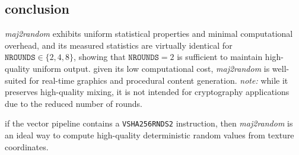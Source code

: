\documentclass{scrartcl}
\begin{document}
\subsection*{conclusion}

\noindent
\emph{maj2random} exhibits uniform statistical properties and minimal
computational overhead, and its measured statistics are virtually
identical for $\mathtt{NROUNDS} \in \{2, 4, 8\}$, showing that
$\mathtt{NROUNDS}=2$ is sufficient to maintain high-quality uniform output.
given its low computational cost,  \emph{maj2random} is well-suited for
real-time graphics and procedural content generation.  \emph{note:} while
it preserves high-quality mixing, it is not intended for cryptography
applications due to the reduced number of rounds.
\\
\par\noindent
if the vector pipeline contains a \texttt{VSHA256RNDS2} instruction, then
\emph{maj2random} is an ideal way to compute high-quality deterministic
random values from texture coordinates.
\end{document}
